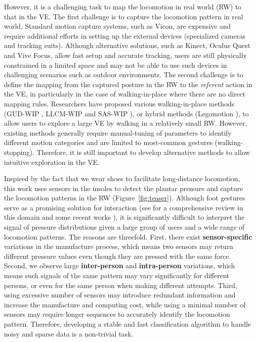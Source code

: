 \documentclass[review]{vgtc}                 %
\begin{document}
However, it is a challenging task to map the locomotion in real world (RW) to that in the VE.
The first challenge is to capture the locomotion pattern in real world.
Standard motion capture systems, such as Vicon, are expensive and require additional efforts in setting up the external devices (specialized cameras and tracking suits).
Although alternative solutions, such as Kinect, Oculus Quest and Vive Focus, allow fast setup and accurate tracking, users are still physically constrained in a limited space and may not be able to use such devices in challenging scenarios such as outdoor environments.
The second challenge is to define the mapping from the captured posture in the RW to the \emph{referent} action \cite{felberbaum2018better} in the VE, in particularly in the case of walking-in-place where there are no direct mapping rules.
Researchers have proposed various walking-in-place methods (GUD-WIP \cite{wendt2010gud}, LLCM-WIP \cite{feasel2008llcm} and SAS-WIP \cite{bruno2013new}), or hybrid methods (Legomotion \cite{bhandari2017legomotion}), to allow users to explore a large VE by walking in a relatively small RW.
However, existing methods generally require manual-tuning of parameters to identify different motion categories and are limited to most-common gestures (walking-stopping).
Therefore, it is still important to develop alternative methods to allow intuitive exploration in the VE. 

Inspired by the fact that we wear shoes to facilitate long-distance locomotion, this work uses sensors in the insoles to detect the plantar pressure and capture the locomotion patterns in the RW (Figure~\ref{fig:teaser}).
Although foot gestures serve as a promising solution for interaction
(see \cite{velloso2015feet} for a comprehensive review in this domain and some recent works \cite{fukahori2015exploring,tajadura2015light,matthies2017capsoles}), it is significantly difficult to interpret the signal of pressure distributions given a large group of users and a wide range of locomotion patterns. 
The reasons are threefold. 
First, there exist \textbf{sensor-specific} variations in the manufacture process, which means two sensors may return different pressure values even though they are pressed with the same force. 
Second, we observe large \textbf{inter-person} and \textbf{intra-person} variations, which means such signals of the same pattern may vary significantly for different persons, or even for the same person when making different attempts. 
Third, 
using excessive number of sensors may introduce redundant information and increase the manufacture and computing cost, while using a minimal number of sensors may require longer sequences to accurately identify the locomotion pattern.
Therefore, developing a stable and fast classification algorithm to handle noisy and sparse data is a non-trivial task.
\end{document}
